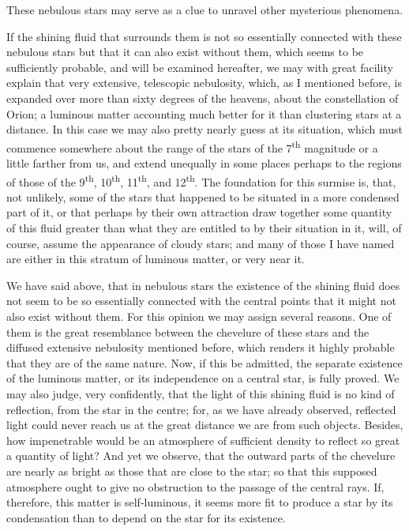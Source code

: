 \documentclass[a4paper, 12pt, oneside, polutonikogreek, english]{article}
\begin{document}
These nebulous stars may serve as a clue to unravel other mysterious phenomena.

If the shining fluid that surrounds them is not so essentially connected with these nebulous stars but that it can also exist without them, which seems to be sufficiently probable, and will be examined hereafter, we may with great facility explain that very extensive, telescopic nebulosity, which, as I mentioned before, is expanded over more than sixty degrees of the heavens, about the constellation of Orion; a luminous matter accounting much better for it than clustering stars at a distance. In this case we may also pretty nearly guess at its situation, which must commence somewhere about the range of the stars of the 7\textsuperscript{th} magnitude or a little farther from us, and extend unequally in some places perhaps to the regions of those of the 9\textsuperscript{th}, 10\textsuperscript{th}, 11\textsuperscript{th}, and 12\textsuperscript{th}. The foundation for this surmise is, that, not unlikely, some of the stars that happened to be situated in a more condensed part of it, or that perhaps by their own attraction draw together some quantity of this fluid greater than what they are entitled to by their situation in it, will, of course, assume the appearance of cloudy stars; and many of those I have named are either in this stratum of luminous matter, or very near it.

We have said above, that in nebulous stars the existence of the shining fluid does not seem to be so essentially connected with the central points that it might not also exist without them. For this opinion we may assign several reasons. One of them is the great resemblance between the chevelure of these stars and the diffused extensive nebulosity mentioned before, which renders it highly probable that they are of the same nature. Now, if this be admitted, the separate existence of the luminous matter, or its independence on a central star, is fully proved. We may also judge, very confidently, that the light of this shining fluid is no kind of reflection, from the star in the centre; for, as we have already observed, reflected light could never reach us at the great distance we are from such objects. Besides, how impenetrable would be an atmosphere of sufficient density to reflect so great a quantity of light? And yet we observe, that the outward parts of the chevelure are nearly as bright as those that are close to the star; so that this supposed atmosphere ought to give no obstruction to the passage of the central rays. If, therefore, this matter is self-luminous, it seems more fit to produce a star by its condensation than to depend on the star for its existence.
\end{document}
